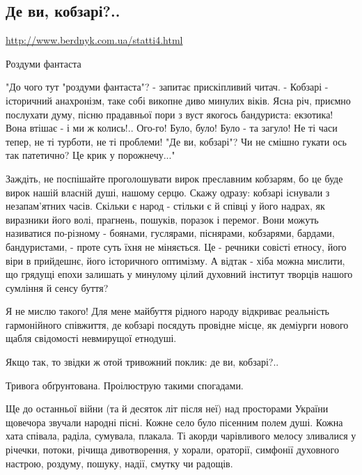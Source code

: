  
 

\subsection{Де ви, кобзарі?..}

\url{http://www.berdnyk.com.ua/statti4.html}

Роздуми фантаста

"До чого тут "роздуми фантаста"? - запитає прискіпливий читач. - Кобзарі -
історичний анахронізм, таке собі викопне диво минулих віків. Ясна річ, приємно
послухати думу, пісню прадавньої пори з вуст якогось бандуриста: екзотика! Вона
втішає - і ми ж колись!.. Ого-го! Було, було! Було - та загуло! Не ті часи
тепер, не ті турботи, не ті проблеми! "Де ви, кобзарі"? Чи не смішно гукати ось
так патетично? Це крик у порожнечу..."

Заждіть, не поспішайте проголошувати вирок преславним кобзарям, бо це буде
вирок нашій власній душі, нашому серцю. Скажу одразу: кобзарі існували з
незапам'ятних часів. Скільки є народ - стільки є й співці у його надрах, як
виразники його волі, прагнень, пошуків, поразок і перемог. Вони можуть
називатися по-різному - боянами, гуслярами, піснярами, кобзарями, бардами,
бандуристами, - проте суть їхня не міняється. Це - речники совісті етносу, його
віри в прийдешнє, його історичного оптимізму. А відтак - хіба можна мислити, що
грядущі епохи залишать у минулому цілий духовний інститут творців нашого
сумління й сенсу буття?

Я не мислю такого! Для мене майбуття рідного народу відкриває реальність
гармонійного співжиття, де кобзарі посядуть провідне місце, як деміурги нового
щабля свідомості невмирущої етнодуші.

Якщо так, то звідки ж отой тривожний поклик: де ви, кобзарі?..

Тривога обґрунтована. Проілюструю такими спогадами.

Ще до останньої війни (та й десяток літ після неї) над просторами України
щовечора звучали народні пісні. Кожне село було пісенним полем душі. Кожна хата
співала, раділа, сумувала, плакала. Ті акорди чарівливого мелосу зливалися у
річечки, потоки, річища дивотворення, у хорали, ораторії, симфонії духовного
настрою, роздуму, пошуку, надії, смутку чи радощів.


